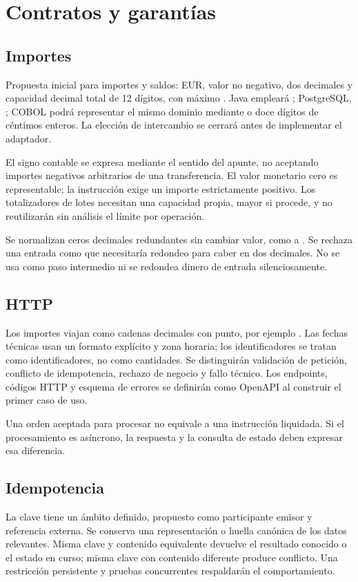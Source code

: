 \chapter{Contratos y garantías}
\section{Importes}
Propuesta inicial para importes y saldos: EUR, valor no negativo, dos decimales y capacidad decimal total de 12 dígitos, con máximo . Java empleará ; PostgreSQL, ; COBOL podrá representar el mismo dominio mediante  o doce dígitos de céntimos enteros. La elección de intercambio se cerrará antes de implementar el adaptador.

El signo contable se expresa mediante el sentido del apunte, no aceptando importes negativos arbitrarios de una transferencia. El valor monetario cero es representable; la instrucción exige un importe estrictamente positivo. Los totalizadores de lotes necesitan una capacidad propia, mayor si procede, y no reutilizarán sin análisis el límite por operación.

Se normalizan ceros decimales redundantes sin cambiar valor, como  a . Se rechaza una entrada como  que necesitaría redondeo para caber en dos decimales. No se usa  como paso intermedio ni se redondea dinero de entrada silenciosamente.

\section{HTTP}
Los importes viajan como cadenas decimales con punto, por ejemplo . Las fechas técnicas usan un formato explícito y zona horaria; los identificadores se tratan como identificadores, no como cantidades. Se distinguirán validación de petición, conflicto de idempotencia, rechazo de negocio y fallo técnico. Los endpoints, códigos HTTP y esquema de errores se definirán como OpenAPI al construir el primer caso de uso.

Una orden aceptada para procesar no equivale a una instrucción liquidada. Si el procesamiento es asíncrono, la respuesta y la consulta de estado deben expresar esa diferencia.

\section{Idempotencia}
La clave tiene un ámbito definido, propuesto como participante emisor y referencia externa. Se conserva una representación o huella canónica de los datos relevantes. Misma clave y contenido equivalente devuelve el resultado conocido o el estado en curso; misma clave con contenido diferente produce conflicto. Una restricción persistente y pruebas concurrentes respaldarán el comportamiento.

